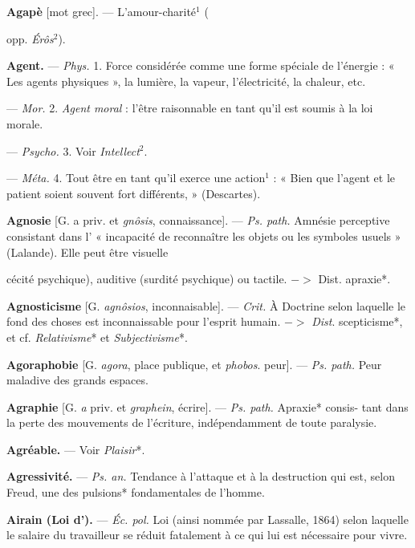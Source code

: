 \begin{itemize}[leftmargin=1cm, label=, itemsep=1pt]
\item {\bf Agapè} [mot grec]. — L'amour-charité$^1$
({opp. {\it Érôs}$^2$).

\item {\bf Agent.} — \textsf{\textit {Phys.}} 1. Force considérée
comme une forme spéciale de l’énergie : « Les agents physiques », la
lumière, la vapeur, l'électricité, la
chaleur, etc.

— \textsf{\textit {Mor.}} 2. {\it Agent moral} : l'être
raisonnable en tant qu’il est soumis
à la loi morale.

— \textsf{\textit {Psycho.}} 3. Voir {\it Intellect}$^2$.

— \textsf{\textit {Méta.}} 4. Tout être en tant
qu’il exerce une action$^1$ : « Bien
que l'agent et le patient soient souvent fort différents, » (Descartes).

\item {\bf Agnosie} [G. a priv. et {\it gnôsis}, connaissance]. — \textsf{\textit {Ps. path.}} Amnésie
perceptive consistant dans l’ « incapacité de reconnaître les objets ou les
symboles usuels » (Lalande). Elle
peut être visuelle {cécité psychique),
auditive (surdité psychique) ou tactile. $->$ Dist. apraxie*.

\item {\bf Agnosticisme} [G. {\it agnôsios}, inconnaisable].
— \textsf{\textit {Crit.}} À Doctrine selon
laquelle le fond des choses est
inconnaissable pour l'esprit humain.
$->$ {\it Dist}. scepticisme*, et cf. {\it Relativisme}* et {\it Subjectivisme}*.

\item {\bf Agoraphobie} [G. {\it agora}, place publique,
et {\it phobos}. peur]. — \textsf{\textit {Ps. path.}} Peur
maladive des grands espaces.

\item {\bf Agraphie} [G. {\it a} priv. et {\it graphein},
écrire]. — \textsf{\textit {Ps. path.}} Apraxie* consis-
tant dans la perte des mouvements
de l'écriture, indépendamment de
toute paralysie.

\item {\bf Agréable.} — Voir {\it Plaisir}*.

\item {\bf Agressivité.} — \textsf{\textit {Ps. an.}} Tendance à
l’attaque et à la destruction qui est,
selon Freud, une des pulsions* fondamentales de l'homme.

\item {\bf Airain (Loi d').} — \textsf{\textit {Éc. pol.}} Loi (ainsi
nommée par Lassalle, 1864) selon
laquelle le salaire du travailleur se
réduit fatalement à ce qui lui est
nécessaire pour vivre.

}}
\end{itemize}
